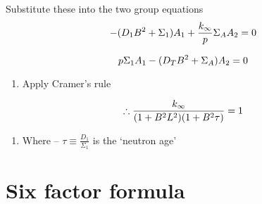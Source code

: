 \documentclass[aspectratio=1610,pdftex,dvipsnames,compress,xcolor={dvipsnames}]{beamer}
\begin{document}
\begin{frame}{Substitute these into the two group equations}
    \begin{equation}
        \LARGE
        -(D_1 B^2 + \Sigma_1) A_1 + \frac{k_\infty}{p} \Sigma_A A_2=0
    \end{equation}

    \begin{equation}
        \LARGE
        p \Sigma_1 A_1 - (D_TB^2 + \Sigma_A) A_2 = 0
    \end{equation}

    \vspace*{\fill}

    \begin{enumerate}[series=outerlist,topsep=0pt,itemsep=11pt,leftmargin=*,label=(\arabic*)]
        \item[]Apply Cramer's rule
    \end{enumerate}

    \vspace*{\fill}

    \begin{equation}
        \LARGE
        \therefore \frac{k_\infty}{(1 + B^2 L^2)(1 + B^2 \tau)} = 1
    \end{equation}

    \vspace*{\fill}

    \begin{enumerate}[series=outerlist,topsep=0pt,itemsep=11pt,leftmargin=*,label=(\arabic*)]
        \item[]Where -- $\tau \equiv \frac{D_1}{\Sigma_1}$ is the `neutron age'
    \end{enumerate}
\end{frame}


\section{Six factor formula}
\end{document}
